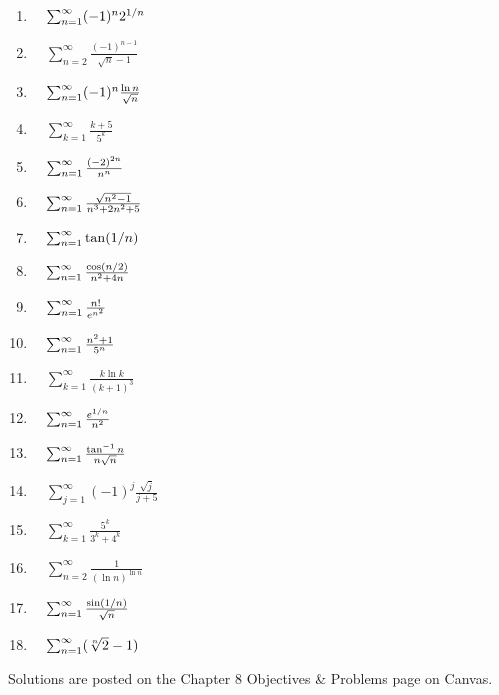 \documentclass[10pt]{article}
\begin{document}
\begin{enumerate}
\item \(\quad \sum_{n=1}^\infty (-1)^n 2^{1/n}\)

\item \(\quad \sum_{n=2}^\infty \frac{(-1)^{n-1}}{\sqrt{n}-1}\)

\item \(\quad \sum_{n=1}^\infty (-1)^n\frac{\ln n}{\sqrt{n}}\)

\item \(\quad \sum_{k=1}^\infty \frac{k+5}{5^k}\)


\item \(\quad \sum_{n=1}^\infty \frac{(-2)^{2n}}{n^n}\)

\item \(\quad \sum_{n=1}^\infty \frac{\sqrt{n^2-1}}{n^3+2n^2+5}\)

\item \(\quad \sum_{n=1}^\infty \tan(1/n)\)

\item \(\quad \sum_{n=1}^\infty \frac{\cos(n/2)}{n^2+4n}\)

\item \(\quad \sum_{n=1}^\infty \frac{n!}{e^{n^2}}\)

\item \(\quad \sum_{n=1}^\infty \frac{n^2+1}{5^n}\)



\item \(\quad \sum_{k=1}^\infty \frac{k \ln k}{(k+1)^3}\)

\item \(\quad \sum_{n=1}^\infty \frac{e^{1/n}}{n^2}\)

\item \(\quad \sum_{n=1}^\infty \frac{\tan^{-1} n}{n\sqrt{n}}\)

\item \(\quad \sum_{j=1}^\infty (-1)^j \frac{\sqrt{j}}{j+5}\)

\item \(\quad \sum_{k=1}^\infty \frac{5^k}{3^k + 4^k}\)

\item \(\quad \sum_{n=2}^\infty \frac{1}{(\ln n)^{\ln n}}\)

\item \(\quad \sum_{n=1}^\infty \frac{\sin(1/n)}{\sqrt{n}}\)

\item \(\quad \sum_{n=1}^\infty ( \sqrt[n]{2} - 1 )\)

\end{enumerate}



Solutions are posted on the Chapter 8 Objectives \& Problems page on  Canvas.\\


\pagebreak



\end{document}
